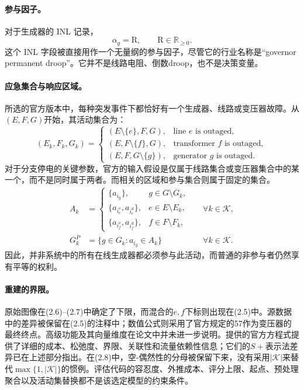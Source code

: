 \documentclass{article}
\begin{document}
\paragraph{参与因子。}
对于生成器的 INL 记录，
\[
\alpha_g=\mathrm R,\qquad \mathrm R\in\mathbb R_{\geq0}.
\]
这个 INL 字段被直接用作一个无量纲的参与因子，尽管它的行业名称是“governor permanent droop”。它并不是线路电阻、倒数droop，也不是决策变量。

\paragraph{应急集合与响应区域。}
所选的官方版本中，每种突发事件下都恰好有一个生成器、线路或变压器故障。从$(E,F,G)$开始，其活动集合为：
\[
(E_k,F_k,G_k)=
\begin{cases}
(E\setminus\{e\},F,G),&\text{line }e\text{ is outaged},\\
(E,F\setminus\{f\},G),&\text{transformer }f\text{ is outaged},\\
(E,F,G\setminus\{g\}),&\text{generator }g\text{ is outaged}.
\end{cases}
\]
对于分支停电的关键参数，官方的输入假设是仅属于线路集合或变压器集合中的某一个，而不是同时属于两者。而相关的区域和参与集合则属于固定的集合。
\begin{align*}
A_k&=
\begin{cases}
\{a_{i_g}\},&g\in G\setminus G_k,\\
\{a_{i_e^o},a_{i_e^d}\},&e\in E\setminus E_k,\\
\{a_{i_f^o},a_{i_f^d}\},&f\in F\setminus F_k,
\end{cases}
&&\forall k\in\mathcal K,\\
G_k^P&=\{g\in G_k:a_{i_g}\in A_k\}
&&\forall k\in\mathcal K.
\end{align*}
因此，并非系统中的所有在线生成器都必须参与此活动，而普通的非参与者仍然享有平等的权利。

\paragraph{重建的界限。}
原始图像在(2.6)--(2.7)中确定了下限，而混合的$e,f$下标则出现在(2.5)中。源数据中的差异被保留在(2.5)的注释中；数值公式则采用了官方规定的57作为变压器的最终终点。高级功能及其向量维度在论文中并未进一步说明。提供的官方方程式提供了详细的成本、松弛度、界限、关联性和流量依赖性信息；它们的$S+$表示法差异已在上述部分指出。在(2.8)中，空-偶然性的分母被保留下来，没有采用$|\mathcal K|$来替代$\max\{1,|\mathcal K|\}$的惯例。评估代码的容忍度、外推成本、评分上限、起点、预处理聚合以及活动集替换都不是该选定模型的约束条件。
\end{document}
